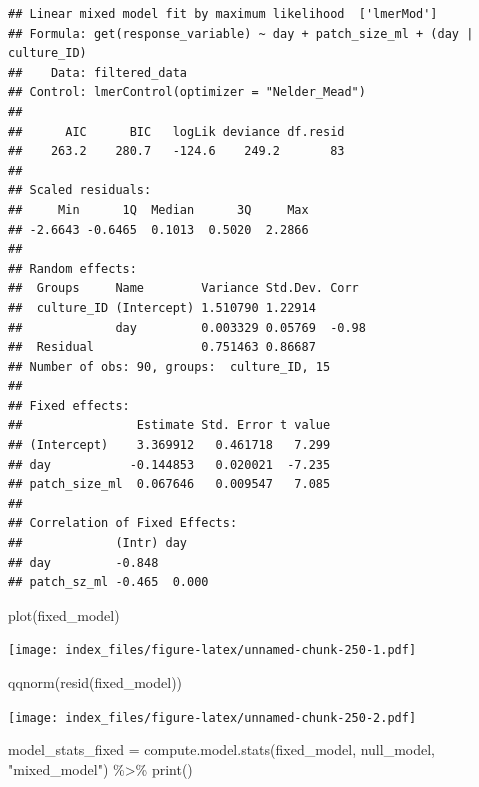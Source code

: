 \documentclass[
]{article}
\newenvironment{Shaded}{\begin{snugshade}}{\end{snugshade}}
\newcommand{\FunctionTok}[1]{\textcolor[rgb]{0.00,0.00,0.00}{#1}}
\newcommand{\NormalTok}[1]{#1}
\newcommand{\OtherTok}[1]{\textcolor[rgb]{0.56,0.35,0.01}{#1}}
\newcommand{\SpecialCharTok}[1]{\textcolor[rgb]{0.00,0.00,0.00}{#1}}
\newcommand{\StringTok}[1]{\textcolor[rgb]{0.31,0.60,0.02}{#1}}
\begin{document}
\begin{verbatim}
## Linear mixed model fit by maximum likelihood  ['lmerMod']
## Formula: get(response_variable) ~ day + patch_size_ml + (day | culture_ID)
##    Data: filtered_data
## Control: lmerControl(optimizer = "Nelder_Mead")
## 
##      AIC      BIC   logLik deviance df.resid 
##    263.2    280.7   -124.6    249.2       83 
## 
## Scaled residuals: 
##     Min      1Q  Median      3Q     Max 
## -2.6643 -0.6465  0.1013  0.5020  2.2866 
## 
## Random effects:
##  Groups     Name        Variance Std.Dev. Corr 
##  culture_ID (Intercept) 1.510790 1.22914       
##             day         0.003329 0.05769  -0.98
##  Residual               0.751463 0.86687       
## Number of obs: 90, groups:  culture_ID, 15
## 
## Fixed effects:
##                Estimate Std. Error t value
## (Intercept)    3.369912   0.461718   7.299
## day           -0.144853   0.020021  -7.235
## patch_size_ml  0.067646   0.009547   7.085
## 
## Correlation of Fixed Effects:
##             (Intr) day   
## day         -0.848       
## patch_sz_ml -0.465  0.000
\end{verbatim}

\begin{Shaded}
\begin{Highlighting}[]
\FunctionTok{plot}\NormalTok{(fixed\_model)}
\end{Highlighting}
\end{Shaded}

\texttt{[image: index\_files/figure-latex/unnamed-chunk-250-1.pdf]}

\begin{Shaded}
\begin{Highlighting}[]
\FunctionTok{qqnorm}\NormalTok{(}\FunctionTok{resid}\NormalTok{(fixed\_model))}
\end{Highlighting}
\end{Shaded}

\texttt{[image: index\_files/figure-latex/unnamed-chunk-250-2.pdf]}

\begin{Shaded}
\begin{Highlighting}[]
\NormalTok{model\_stats\_fixed }\OtherTok{=} \FunctionTok{compute.model.stats}\NormalTok{(fixed\_model,}
\NormalTok{                                        null\_model,}
                                        \StringTok{"mixed\_model"}\NormalTok{) }\SpecialCharTok{\%\textgreater{}\%}
  \FunctionTok{print}\NormalTok{()}
\end{Highlighting}
\end{Shaded}
\end{document}
